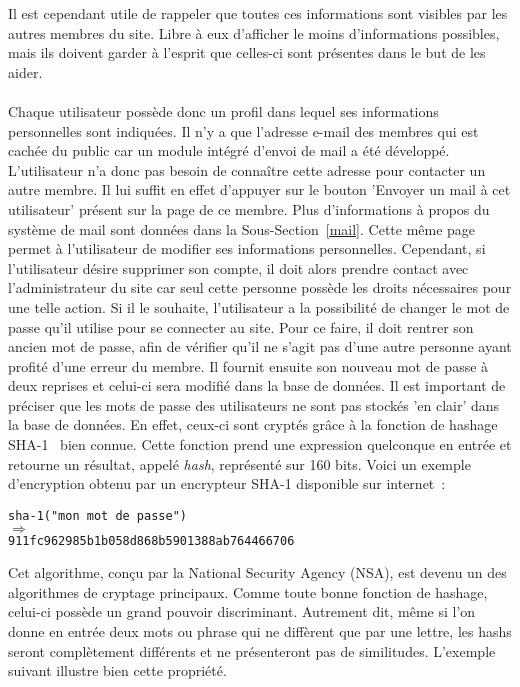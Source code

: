 \documentclass[12pt, a4paper, oneside]{article}
\begin{document}
    Il est cependant utile de rappeler que toutes ces informations sont visibles par les autres membres du site. Libre à eux d'afficher le moins d'informations possibles, mais ils doivent garder à l'esprit que celles-ci sont présentes dans le but de les aider.\\\\
    \indent Chaque utilisateur possède donc un profil dans lequel ses informations personnelles sont indiquées. Il n'y a que l'adresse e-mail des membres qui est cachée du public car un module intégré d'envoi de mail a été développé. L'utilisateur n'a donc pas besoin de connaître cette adresse pour contacter un autre membre. Il lui suffit en effet d'appuyer sur le bouton 'Envoyer un mail à cet utilisateur' présent sur la page de ce membre. Plus d'informations à propos du système de mail sont données dans la Sous-Section~\ref{mail}. Cette même page permet à l'utilisateur de modifier ses informations personnelles. Cependant, si l'utilisateur désire supprimer son compte, il doit alors prendre contact avec l'administrateur du site car seul cette personne possède les droits nécessaires pour une telle action. Si il le souhaite, l'utilisateur a la possibilité de changer le mot de passe qu'il utilise pour se connecter au site. Pour ce faire, il doit rentrer son ancien mot de passe, afin de vérifier qu'il ne s'agit pas d'une autre personne ayant profité d'une erreur du membre. Il fournit ensuite son nouveau mot de passe à deux reprises et celui-ci sera modifié dans la base de données. Il est important de préciser que les mots de passe des utilisateurs ne sont pas stockés 'en clair' dans la base de données. En effet, ceux-ci sont cryptés grâce à la fonction de hashage SHA-1~\cite{SHA-1} bien connue. Cette fonction prend une expression quelconque en entrée et retourne un résultat, appelé \textit{hash}, représenté sur 160 bits.  Voici un exemple d'encryption obtenu par un encrypteur SHA-1 disponible sur internet~\cite{sha-1-encrypter}:
    \begin{center}
        \verb?sha-1("mon mot de passe")?\\
        $\Longrightarrow$\\
        \verb?911fc962985b1b058d868b5901388ab764466706?\\
    \end{center}
    Cet algorithme, conçu par la National Security Agency (NSA), est devenu un des algorithmes de cryptage principaux. Comme toute bonne fonction de hashage, celui-ci possède un grand pouvoir discriminant. Autrement dit, même si l'on donne en entrée deux mots ou phrase qui ne diffèrent que par une lettre, les hashs seront complètement différents et ne présenteront pas de similitudes. L'exemple suivant illustre bien cette propriété.
\end{document}
